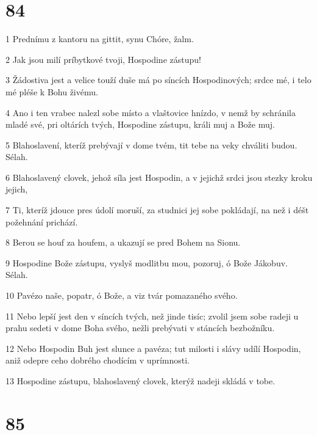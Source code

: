\chapter{84}

\par 1 Prednímu z kantoru na gittit, synu Chóre, žalm.
\par 2 Jak jsou milí príbytkové tvoji, Hospodine zástupu!
\par 3 Žádostiva jest a velice touží duše má po síncích Hospodinových; srdce mé, i telo mé pléše k Bohu živému.
\par 4 Ano i ten vrabec nalezl sobe místo a vlaštovice hnízdo, v nemž by schránila mladé své, pri oltárích tvých, Hospodine zástupu, králi muj a Bože muj.
\par 5 Blahoslavení, kteríž prebývají v dome tvém, tit tebe na veky chváliti budou. Sélah.
\par 6 Blahoslavený clovek, jehož síla jest Hospodin, a v jejichž srdci jsou stezky kroku jejich,
\par 7 Ti, kteríž jdouce pres údolí moruší, za studnici jej sobe pokládají, na než i déšt požehnání prichází.
\par 8 Berou se houf za houfem, a ukazují se pred Bohem na Sionu.
\par 9 Hospodine Bože zástupu, vyslyš modlitbu mou, pozoruj, ó Bože Jákobuv. Sélah.
\par 10 Pavézo naše, popatr, ó Bože, a viz tvár pomazaného svého.
\par 11 Nebo lepší jest den v síncích tvých, než jinde tisíc; zvolil jsem sobe radeji u prahu sedeti v dome Boha svého, nežli prebývati v stáncích bezbožníku.
\par 12 Nebo Hospodin Buh jest slunce a pavéza; tut milosti i slávy udílí Hospodin, aniž odepre ceho dobrého chodícím v uprímnosti.
\par 13 Hospodine zástupu, blahoslavený clovek, kterýž nadeji skládá v tobe.

\chapter{85}

